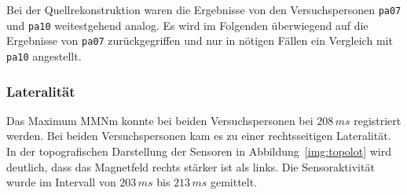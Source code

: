 \documentclass[doc,a4paper,12pt]{apa6}
\begin{document}
Bei der Quellrekonstruktion waren die Ergebnisse von den Versuchspersonen \texttt{pa07} und \texttt{pa10} weitestgehend analog. Es wird im Folgenden überwiegend auf die Ergebnisse von \texttt{pa07} zurückgegriffen und nur in nötigen Fällen ein Vergleich mit \texttt{pa10} angestellt.

\subsubsection{Lateralität}

Das Maximum MMNm konnte bei beiden Versuchspersonen bei $208\,ms$ registriert werden. Bei beiden Versuchspersonen kam es zu einer rechtsseitigen Lateralität. In der topografischen Darstellung der Sensoren in Abbildung~\ref{img:topolot} wird deutlich, dass das Magnetfeld rechts stärker ist als links. Die Sensoraktivität wurde im Intervall von  $203\,ms$ bis $213\,ms$ gemittelt.
\end{document}
